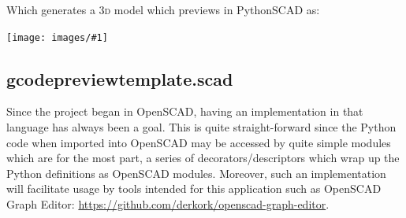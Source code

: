 \documentclass{ltxdoc}
\newcommand{\includeimage}[1]{\bigskip\noindent\texttt{[image: images/\#1]}\bigskip}
\begin{document}
\begin{samepage}
\noindent Which generates a \textsc{3d} model which previews in PythonSCAD as:

\bigskip

\includeimage{gcodepreviewtemplate.png}
\end{samepage}

\subsection{gcodepreviewtemplate.scad}

Since the project began in OpenSCAD, having an implementation in that language has always been a goal. This is quite straight-forward since the Python code when imported into OpenSCAD may be accessed by quite simple modules which are for the most part, a series of decorators/descriptors which wrap up the Python definitions as OpenSCAD modules. Moreover, such an implementation will facilitate usage by tools intended for this application such as OpenSCAD Graph Editor: \url{https://github.com/derkork/openscad-graph-editor}. 
\end{document}
